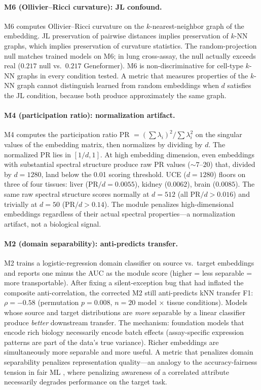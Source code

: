 \documentclass[9pt,lineno]{elife}
\begin{document}
\paragraph{M6 (Ollivier--Ricci curvature): JL confound.}

M6 computes Ollivier--Ricci curvature on the $k$-nearest-neighbor graph of the embedding. JL preservation of pairwise distances implies preservation of $k$-NN graphs, which implies preservation of curvature statistics. The random-projection null matches trained models on M6; in lung cross-assay, the null actually exceeds real ($0.217$ null vs.\ $0.217$ Geneformer). M6 is non-discriminative for cell-type $k$-NN graphs in every condition tested. A metric that measures properties of the $k$-NN graph cannot distinguish learned from random embeddings when $d$ satisfies the JL condition, because both produce approximately the same graph.

\paragraph{M4 (participation ratio): normalization artifact.}
\label{sec:m4}

M4 computes the participation ratio PR $= (\sum \lambda_i)^2 / \sum \lambda_i^2$ on the singular values of the embedding matrix, then normalizes by dividing by $d$. The normalized PR lies in $[1/d, 1]$. At high embedding dimension, even embeddings with substantial spectral structure produce raw PR values ($\sim 7$--$20$) that, divided by $d = 1280$, land below the 0.01 scoring threshold. UCE ($d = 1280$) floors on three of four tissues: liver (PR$/d = 0.0055$), kidney ($0.0062$), brain ($0.0085$). The same raw spectral structure scores normally at $d = 512$ (all PR$/d > 0.016$) and trivially at $d = 50$ (PR$/d > 0.14$). The module penalizes high-dimensional embeddings regardless of their actual spectral properties---a normalization artifact, not a biological signal.

\paragraph{M2 (domain separability): anti-predicts transfer.}

M2 trains a logistic-regression domain classifier on source vs.\ target embeddings and reports one minus the AUC as the module score (higher = less separable = more transportable). After fixing a silent-exception bug that had inflated the composite anti-correlation, the corrected M2 still anti-predicts kNN transfer F1: $\rho = -0.58$ (permutation $p = 0.008$, $n = 20$ model $\times$ tissue conditions). Models whose source and target distributions are \emph{more} separable by a linear classifier produce \emph{better} downstream transfer. The mechanism: foundation models that encode rich biology necessarily encode batch effects (assay-specific expression patterns are part of the data's true variance). Richer embeddings are simultaneously more separable and more useful. A metric that penalizes domain separability penalizes representation quality---an analogy to the accuracy-fairness tension in fair ML \citep{chouldechova2017impossibility}, where penalizing awareness of a correlated attribute necessarily degrades performance on the target task.
\end{document}
